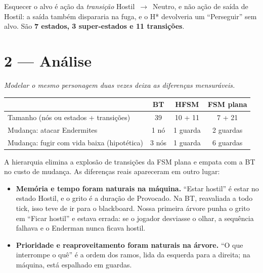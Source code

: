 \documentclass[11pt,a4paper]{article}
\newcommand{\gancho}[1]{\textcolor{destaque}{\textit{#1}}\par}
\begin{document}
\begin{center}
\end{center}

Esquecer o alvo é ação da \emph{transição} Hostil~$\to$~Neutro, e não ação
de saída de Hostil: a saída também dispararia na fuga, e o H* devolveria um
``Perseguir'' sem alvo. São \textbf{7 estados, 3 super-estados e 11
transições}.

\section{2 --- Análise}

\gancho{Modelar o mesmo personagem duas vezes deixa as diferenças
mensuráveis.}

\begin{center}
\begin{tabularx}{\textwidth}{@{}Xccc@{}}
\toprule
 & BT & HFSM & FSM plana \\
\midrule
Tamanho (nós ou estados + transições) & 39 & 10 + 11 & 7 + 21 \\
Mudança: atacar Endermites & 1 nó & 1 guarda & 2 guardas \\
Mudança: fugir com vida baixa (hipotética) & 3 nós & 1 guarda & 6 guardas \\
\bottomrule
\end{tabularx}
\end{center}

A hierarquia elimina a explosão de transições da FSM plana e empata com a BT
no custo de mudança. As diferenças reais apareceram em outro lugar:

\begin{itemize}
  \item \textbf{Memória e tempo foram naturais na máquina.} ``Estar
    hostil'' é estar no estado Hostil, e o grito é a duração de Provocado.
    Na BT, reavaliada a todo tick, isso teve de ir para o blackboard. Nossa
    primeira árvore punha o grito em ``Ficar hostil'' e estava errada: se o
    jogador desviasse o olhar, a sequência falhava e o Enderman nunca ficava
    hostil.
  \item \textbf{Prioridade e reaproveitamento foram naturais na árvore.}
    ``O que interrompe o quê'' é a ordem dos ramos, lida da esquerda para a
    direita; na máquina, está espalhado em guardas.
\end{itemize}
\end{document}
